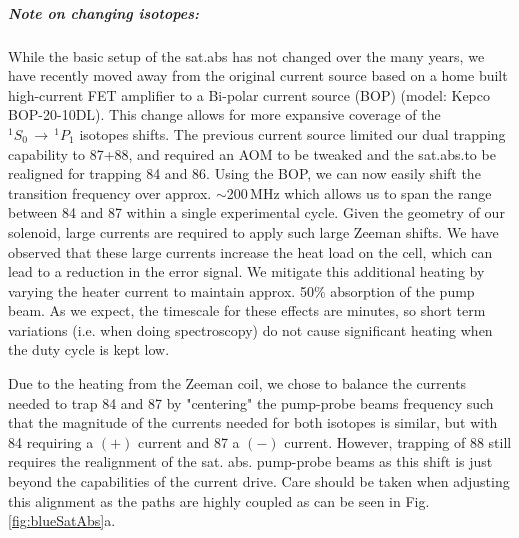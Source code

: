 \subparagraph{Note on changing isotopes:} \label{para:change_iso}
While the basic setup of the sat.\;abs\; has not changed over the many years, we have recently moved away from the original current source based on a home built high-current FET amplifier to a Bi-polar current source (BOP) (model: Kepco BOP-20-10DL).
This change allows for more expansive coverage of the $^1S_0\,\rightarrow\,^1P_1$ isotopes shifts. The previous current source limited our dual trapping capability to 87+88, and required an AOM to be tweaked and the sat.\;abs.\;to be realigned for trapping 84 and 86. 
Using the BOP, we can now easily shift the transition frequency over approx. $\sim$200\,MHz which allows us to span the range between 84 and 87 within a single experimental cycle.
Given the geometry of our solenoid, large currents are required to apply such large Zeeman shifts.
We have observed that these large currents increase the heat load on the cell, which can lead to a reduction in the error signal.
We mitigate this additional heating by varying the heater current to maintain approx. 50\% absorption of the pump beam.
As we expect, the timescale for these effects are minutes, so short term variations (i.e. when doing spectroscopy) do not cause significant heating when the duty cycle is kept low.

Due to the heating from the Zeeman coil, we chose to balance the currents needed to trap 84 and 87 by "centering" the pump-probe beams frequency such that the magnitude of the currents needed for both isotopes is similar, but with 84 requiring a $(+)$ current and 87 a $(-)$ current.
However, trapping of 88 still requires the realignment of the sat. abs. pump-probe beams as this shift is just beyond the capabilities of the current drive. 
Care should be taken when adjusting this alignment as the paths are highly coupled as can be seen in Fig.\,\ref{fig:blueSatAbs}a.

%
%
%
%	
%		

